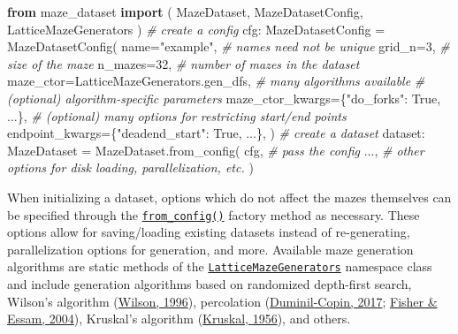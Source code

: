 \documentclass[10pt,a4paper,onecolumn]{article}
\newenvironment{Shaded}{}{}
\newcommand{\CommentTok}[1]{\textcolor[rgb]{0.38,0.63,0.69}{\textit{#1}}}
\newcommand{\DecValTok}[1]{\textcolor[rgb]{0.25,0.63,0.44}{#1}}
\newcommand{\ImportTok}[1]{\textcolor[rgb]{0.00,0.50,0.00}{\textbf{#1}}}
\newcommand{\NormalTok}[1]{#1}
\newcommand{\OperatorTok}[1]{\textcolor[rgb]{0.40,0.40,0.40}{#1}}
\newcommand{\StringTok}[1]{\textcolor[rgb]{0.25,0.44,0.63}{#1}}
\newcommand{\VariableTok}[1]{\textcolor[rgb]{0.10,0.09,0.49}{#1}}
\begin{document}
\begin{Shaded}
\begin{Highlighting}[]
\ImportTok{from}\NormalTok{ maze\_dataset }\ImportTok{import}\NormalTok{ (}
\NormalTok{  MazeDataset, MazeDatasetConfig, LatticeMazeGenerators}
\NormalTok{)}
\CommentTok{\# create a config}
\NormalTok{cfg: MazeDatasetConfig }\OperatorTok{=}\NormalTok{ MazeDatasetConfig(}
\NormalTok{    name}\OperatorTok{=}\StringTok{"example"}\NormalTok{, }\CommentTok{\# names need not be unique}
\NormalTok{    grid\_n}\OperatorTok{=}\DecValTok{3}\NormalTok{,   }\CommentTok{\# size of the maze}
\NormalTok{    n\_mazes}\OperatorTok{=}\DecValTok{32}\NormalTok{, }\CommentTok{\# number of mazes in the dataset}
\NormalTok{    maze\_ctor}\OperatorTok{=}\NormalTok{LatticeMazeGenerators.gen\_dfs, }\CommentTok{\# many algorithms available}
    \CommentTok{\# (optional) algorithm{-}specific parameters}
\NormalTok{    maze\_ctor\_kwargs}\OperatorTok{=}\NormalTok{\{}\StringTok{"do\_forks"}\NormalTok{: }\VariableTok{True}\NormalTok{, ...\}, }
    \CommentTok{\# (optional) many options for restricting start/end points}
\NormalTok{    endpoint\_kwargs}\OperatorTok{=}\NormalTok{\{}\StringTok{"deadend\_start"}\NormalTok{: }\VariableTok{True}\NormalTok{, ...\},}
\NormalTok{)}
\CommentTok{\# create a dataset}
\NormalTok{dataset: MazeDataset }\OperatorTok{=}\NormalTok{ MazeDataset.from\_config(}
\NormalTok{  cfg, }\CommentTok{\# pass the config}
\NormalTok{  ..., }\CommentTok{\# other options for disk loading, parallelization, etc.}
\NormalTok{)}
\end{Highlighting}
\end{Shaded}

When initializing a dataset, options which do not affect the mazes
themselves can be specified through the
\href{https://understanding-search.github.io/maze-dataset/maze_dataset.html\#MazeDataset.from_config}{\texttt{from\_config()}}
factory method as necessary. These options allow for saving/loading
existing datasets instead of re-generating, parallelization options for
generation, and more. Available maze generation algorithms are static
methods of the
\href{https://understanding-search.github.io/maze-dataset/maze_dataset.html\#LatticeMazeGenerators}{\texttt{LatticeMazeGenerators}}
namespace class and include generation algorithms based on randomized
depth-first search, Wilson's algorithm
(\protect\hyperlink{ref-wilson}{Wilson, 1996}), percolation
(\protect\hyperlink{ref-percolation}{Duminil-Copin, 2017};
\protect\hyperlink{ref-percolation-clustersize}{Fisher \& Essam, 2004}),
Kruskal's algorithm
(\protect\hyperlink{ref-kruskal1956shortest}{Kruskal, 1956}), and
others.
\end{document}
